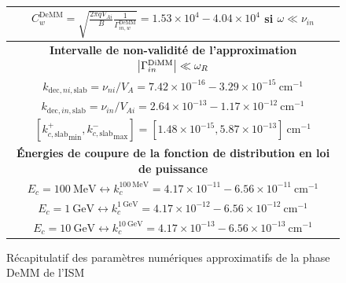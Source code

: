\documentclass[10pt,a4paper]{article}
\begin{document}
\begin{figure}[h]
\begin{tabular}{|c|}
$C^\mathrm{DeMM}_w = \sqrt{\frac{2\pi qV_{Ai}}{B} \frac{1}{\Gamma^\mathrm{DeMM}_{in,w}}} = 1.53\times 10^4 - 4.04 \times 10^4$ si $\omega \ll \nu_{in}$ \\ 
\hline 
\hline
\bf{Intervalle de non-validité de l'approximation $\abs{\Gamma^\mathrm{DiMM}_{in}} \ll \omega_R$} \\ 
\hline
$k_{\mathrm{dec},ni,\mathrm{slab}} = \nu_{ni}/V_A = 7.42\times 10^{-16} - 3.29 \times 10^{-15} ~ \mathrm{cm}^{-1}$ \\ 
$k_{\mathrm{dec},in,\mathrm{slab}} = \nu_{in}/V_{Ai} = 2.64\times 10^{-13} - 1.17 \times 10^{-12} ~ \mathrm{cm}^{-1}$ \\ 
$\left[{k^+_{c,\mathrm{slab}}}_\mathrm{min}, {k^-_{c,\mathrm{slab}}}_\mathrm{max} \right] = [1.48 \times 10^{-15}, 5.87\times 10^{-13}] ~ \mathrm{cm}^{-1}$ \\ 
\hline
\hline
\bf{Énergies de coupure de la fonction de distribution en loi de puissance} \\ 
\hline
$E_c = 100~\mathrm{MeV} \leftrightarrow k^{100~\mathrm{MeV}}_c = 4.17\times 10^{-11} - 6.56 \times 10^{-11}~\mathrm{cm}^{-1}$ \\ 
$E_c = 1~\mathrm{GeV} \leftrightarrow k^{1~\mathrm{GeV}}_c = 4.17\times 10^{-12} - 6.56 \times 10^{-12} ~\mathrm{cm}^{-1}$     \\ 
$E_c = 10~\mathrm{GeV} \leftrightarrow k^{10~\mathrm{GeV}}_c = 4.17\times 10^{-13} - 6.56 \times 10^{-13}~\mathrm{cm}^{-1}$   \\ 
\hline

\end{tabular}
\caption{Récapitulatif des paramètres numériques approximatifs de la phase DeMM de l'ISM} 
\label{param_DeMM}
\end{figure}
\end{document}
